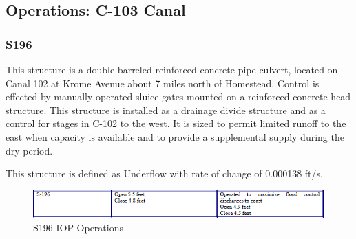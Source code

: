 \clearpage
\subsection{Operations: C-103 Canal}

\subsubsection{S196}
This structure is a double-barreled reinforced concrete pipe culvert, located on Canal 102 at Krome Avenue about 7 miles north of Homestead. Control is effected by manually operated sluice gates mounted on a reinforced concrete head structure. This structure is installed as a drainage divide structure and as a control for stages in C-102 to the west. It is sized to permit limited runoff to the east when capacity is available and to provide a supplemental supply during the dry period.

This structure is defined as Underflow with rate of change of 0.000138 ft/s.

%
%

\begin{figure}[!h]
  \begin{center}
  \includegraphics[width=6.5in]{../figs/S196_IOPops.png}
  \caption{S196 IOP Operations}
  \label{fig:S196iop}
  \end{center}
\end{figure}

